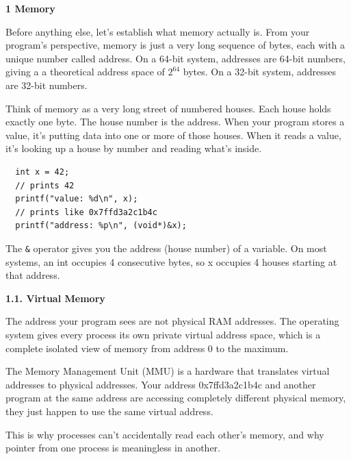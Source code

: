 \noindent\textbf{\LARGE{1 Memory}}

\vspace{0.4cm}

\begin{onehalfspace}
\noindent
\begin{minipage}{\textwidth}
\fontsize{12pt}{15pt}

  Before anything else, let's establish what memory actually is. From your program's perspective, memory is just a very long sequence of bytes, each with a unique number called address. On a 64-bit system, addresses are 64-bit numbers, giving a a theoretical address space of $2^{64}$ bytes. On a 32-bit system, addresses are 32-bit numbers.

  \vspace{0.2cm}

  Think of memory as a very long street of numbered houses. Each house holds exactly one byte. The house number is the address. When your program stores a value, it's putting data into one or more of those houses. When it reads a value, it's looking up a house by number and reading what's inside.

  \vspace{0.3cm}

  \captionsetup[lstlisting]{labelformat=empty}
  \begin{lstlisting}
  int x = 42;
  // prints 42
  printf("value: %d\n", x);
  // prints like 0x7ffd3a2c1b4c
  printf("address: %p\n", (void*)&x);
  \end{lstlisting}

  \vspace{0.1cm}

  The \texttt{\&} operator gives you the address (house number) of a variable. On most systems, an int occupies 4 consecutive bytes, so x occupies 4 houses starting at that address.

  \vspace{0.3cm}

  \noindent\textbf{\large{1.1. Virtual Memory}}

  \vspace{0.3cm}

    The address your program sees are not physical RAM addresses. The operating system gives every process its own private virtual address space, which is a complete isolated view of memory from address 0 to the maximum.

  \vspace{0.2cm}

  The Memory Management Unit (MMU) is a hardware that translates virtual addresses to physical addresses. Your address 0x7ffd3a2c1b4c and another program at the same address are accessing completely different physical memory, they just happen to use the same virtual address.

  \vspace{0.2cm}

  This is why processes can't accidentally read each other's memory, and why pointer from one process is meaningless in another.

\end{minipage}
\end{onehalfspace}
